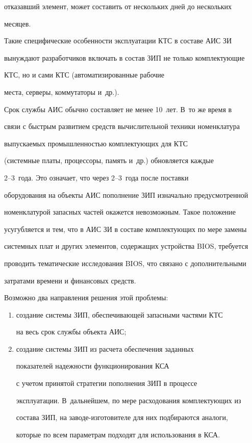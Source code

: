отказавший элемент, может составить от нескольких дней до нескольких 


месяцев.


     


     Такие специфические особенности эксплуатации КТС в составе АИС ЗИ 


вынуждают разработчиков включать в состав ЗИП не только комплектующие 


КТС, но и сами КТС (автоматизированные рабочие 


места, серверы, коммутаторы и~др.).


     


     Срок службы АИС обычно составляет не менее 10~лет. В~то же время в 


связи с быстрым развитием средств вычислительной техники номенклатура 


выпускаемых промышленностью комплектующих для КТС 


(системные платы, процессоры, память и~др.) обновляется каждые 


     2--3~года. Это означает, что через 2--3~года после поставки 


оборудования на объекты АИС пополнение ЗИП изначально предусмотренной 


номенклатурой запасных частей окажется невозможным. Такое положение 


усугубляется и тем, что в АИС ЗИ в составе комплектующих по мере замены 


системных плат и других элементов, содержащих устройства BIOS, требуется 


проводить тематические исследования BIOS, что связано с дополнительными 


затратами времени и финансовых средств.


     


     Возможно два направления решения этой проблемы:


     \begin{enumerate}[(1)]


     \item  создание системы ЗИП, обеспечивающей запасными частями КТС 


на весь срок службы объекта АИС;


     \item создание системы ЗИП из расчета обеспечения заданных 


показателей надежности функционирования КСА 


с учетом принятой стратегии пополнения ЗИП в процессе 


эксплуатации. В~дальнейшем, по мере расходования комплектующих из 


состава ЗИП, на за\-во\-де-из\-го\-то\-ви\-те\-ле для них подбираются аналоги, 


которые по всем параметрам подходят для использования в КСА.


     \end{enumerate}


